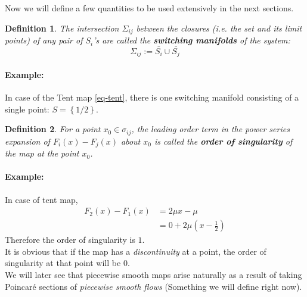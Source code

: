 \documentclass{book}
\renewcommand{\(}{\begin{columns}}
\renewcommand{\)}{\end{columns}}
\newcommand{\<}[1]{\begin{column}{#1}}
\renewcommand{\>}{\end{column}}
\newcommand{\bb}[1]{\textbf{#1}}
\newcommand{\para}{\paragraph}
\newtheorem{definition}{Definition}[section]
\begin{document}
Now we will define a few quantities to be used extensively in the next 
sections.  

\begin{definition}
\label{def-switching_manifold}
The intersection $\Sigma_{ij}$ between the closures (i.e. the set and its limit points) of 
any pair of $S_i$'s are called the \bb{switching manifolds} of the system:\[
\Sigma_{ij}:=\bar{S_i}\cup\bar{S_j}
\]
\end{definition}
\para{Example:}
In case of the Tent map \eqref{eq-tent}, there is one switching manifold 
consisting of a single point:
$S=\left\{1/2\right\}$.  

\begin{definition}
\label{def-sing_order}
For a point $x_0\in\sigma_{ij}$, the leading order term in the power series 
expansion of $F_i(x)-F_j(x)$ about $x_0$ is called the \bb{order of singularity} of the 
map at the point $x_0$.  
\end{definition}
\para{Example:}
In case of tent map, 
\begin{align}
F_2(x)-F_1(x)&=2\mu x-\mu\\
&=0+2\mu(x-\frac{1}{2})
\end{align}
Therefore the order of singularity is $1$. \\


It is obvious that if the map has a \emph{discontinuity} at a point, the order 
of singularity at that point will be $0$. \\ 


We will later see that piecewise smooth maps arise naturally as a result of 
taking Poincaré sections of \emph{piecewise smooth flows} (Something we will 
define right now).
\end{document}
